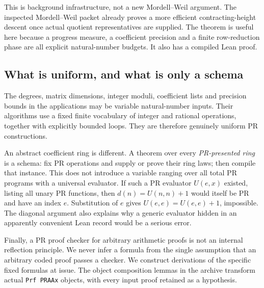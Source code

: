 This is background infrastructure, not a new Mordell--Weil argument.
The inspected Mordell--Weil packet already proves a more efficient
contracting-height descent once actual quotient representatives are
supplied. The theorem is useful here because a progress measure, a
coefficient precision and a finite row-reduction phase are all explicit
natural-number budgets. It also has a compiled Lean proof.

\subsection{What is uniform, and what is only a schema}

The degrees, matrix dimensions, integer moduli, coefficient lists and
precision bounds in the applications may be variable natural-number
inputs. Their algorithms use a fixed finite vocabulary of integer and
rational operations, together with explicitly bounded loops. They are
therefore genuinely uniform PR constructions.

An abstract coefficient ring is different. A theorem over every
\emph{PR-presented ring} is a schema: fix PR operations and supply or prove
their ring laws; then compile that instance. This does not introduce a
variable ranging over all total PR programs with a universal evaluator.
If such a PR evaluator \(U(e,x)\) existed, listing all unary PR functions,
then \(d(n)=U(n,n)+1\) would itself be PR and have an index \(e\).
Substitution of \(e\) gives \(U(e,e)=U(e,e)+1\), impossible. The
diagonal argument also explains why a generic evaluator hidden in an
apparently convenient Lean record would be a serious error.

Finally, a PR proof checker for arbitrary arithmetic proofs is not an
internal reflection principle. We never infer a formula from the single
assumption that an arbitrary coded proof passes a checker. We construct
derivations of the specific fixed formulas at issue. The object
composition lemmas in the archive transform actual \texttt{Prf PRAAx}
objects, with every input proof retained as a hypothesis.
